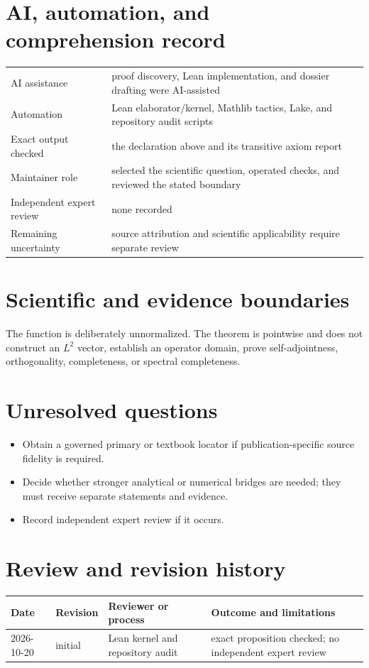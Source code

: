 \documentclass[11pt]{article}
\begin{document}
\section{AI, automation, and comprehension record}
\begin{tabularx}{\textwidth}{@{}lY@{}}\toprule
AI assistance & proof discovery, Lean implementation, and dossier drafting were AI-assisted \\
Automation & Lean elaborator/kernel, Mathlib tactics, Lake, and repository audit scripts \\
Exact output checked & the declaration above and its transitive axiom report \\
Maintainer role & selected the scientific question, operated checks, and reviewed the stated boundary \\
Independent expert review & none recorded \\
Remaining uncertainty & source attribution and scientific applicability require separate review \\
\bottomrule\end{tabularx}

\section{Scientific and evidence boundaries}
The function is deliberately unnormalized. The theorem is pointwise and does not construct an $L^2$ vector, establish an operator domain, prove self-adjointness, orthogonality, completeness, or spectral completeness.

\section{Unresolved questions}
\begin{itemize}
\item Obtain a governed primary or textbook locator if publication-specific source fidelity is required.
\item Decide whether stronger analytical or numerical bridges are needed; they must receive separate statements and evidence.
\item Record independent expert review if it occurs.
\end{itemize}

\section{Review and revision history}
\begin{tabularx}{\textwidth}{@{}lllX@{}}\toprule
Date & Revision & Reviewer or process & Outcome and limitations \\
\midrule
2026-10-20 & initial & Lean kernel and repository audit & exact proposition checked; no independent expert review \\
\bottomrule\end{tabularx}
\end{document}

